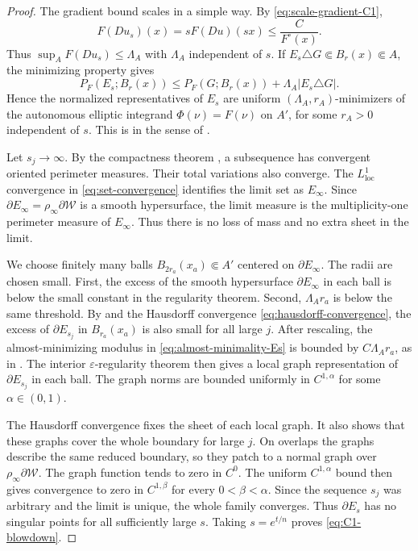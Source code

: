 \documentclass[11pt,reqno]{amsart}
\theoremstyle{definition}
\theoremstyle{remark}
\numberwithin{equation}{section}
\begin{document}
\begin{proof}
The gradient bound scales in a simple way. By \eqref{eq:scale-gradient-C1},
\begin{equation*}
 F(Du_s)(x)=sF(Du)(sx)\leq \frac{C}{F^\circ(x)}.
\end{equation*}
Thus $\sup_A F(Du_s)\leq\Lambda_A$ with $\Lambda_A$ independent of $s$.
If $E_s\triangle G\Subset B_r(x)\Subset A$, the minimizing property gives
\begin{equation}
\label{eq:almost-minimality-Es}
 P_F(E_s;B_r(x))
 \leq P_F(G;B_r(x))+\Lambda_A|E_s\triangle G|.
\end{equation}
Hence the normalized representatives of $E_s$ are uniform
$(\Lambda_A,r_A)$-minimizers of the autonomous elliptic integrand
$\Phi(\nu)=F(\nu)$ on $A'$, for some $r_A>0$ independent of $s$. This is in
the sense of \cite[Definition~1.8 and Lemma~2.16]{DPM15}.

Let $s_j\to\infty$. By the compactness theorem
\cite[Theorem~2.9]{DPM15}, a subsequence has convergent oriented perimeter
measures. Their total variations also converge. The $L^1_{\mathrm{loc}}$
convergence in \eqref{eq:set-convergence} identifies the limit set as
$E_\infty$. Since $\partial E_\infty=\rho_\infty\partial\mathcal W$ is a
smooth hypersurface, the limit measure is the multiplicity-one perimeter
measure of $E_\infty$. Thus there is no loss of mass and no extra sheet in
the limit.

We choose finitely many balls $B_{2r_a}(x_a)\Subset A'$ centered on
$\partial E_\infty$. The radii are chosen small. First, the excess of the
smooth hypersurface $\partial E_\infty$ in each ball is below the small
constant in the regularity theorem. Second, $\Lambda_A r_a$ is below the
same threshold. By \cite[Remark~3.6]{DPM15} and the Hausdorff convergence
\eqref{eq:hausdorff-convergence}, the excess of $\partial E_{s_j}$ in
$B_{r_a}(x_a)$ is also small for all large $j$. After rescaling, the
almost-minimizing modulus in \eqref{eq:almost-minimality-Es} is bounded by
$C\Lambda_A r_a$, as in \cite[(1.16)--(1.17)]{DS02}. The interior
$\varepsilon$-regularity theorem \cite[Theorem~6.1]{DS02} then gives a
local graph representation of $\partial E_{s_j}$ in each ball. The graph
norms are bounded uniformly in $C^{1,\alpha}$ for some $\alpha\in(0,1)$.

The Hausdorff convergence fixes the sheet of each local graph. It also shows
that these graphs cover the whole boundary for large $j$. On overlaps the
graphs describe the same reduced boundary, so they patch to a normal graph
over $\rho_\infty\partial\mathcal W$. The graph function tends to zero in
$C^0$. The uniform $C^{1,\alpha}$ bound then gives convergence to zero in
$C^{1,\beta}$ for every $0<\beta<\alpha$. Since the sequence $s_j$ was
arbitrary and the limit is unique, the whole family converges. Thus
$\partial E_s$ has no singular points for all sufficiently large $s$.
Taking $s=e^{t/n}$ proves \eqref{eq:C1-blowdown}.


\end{proof}
\end{document}

